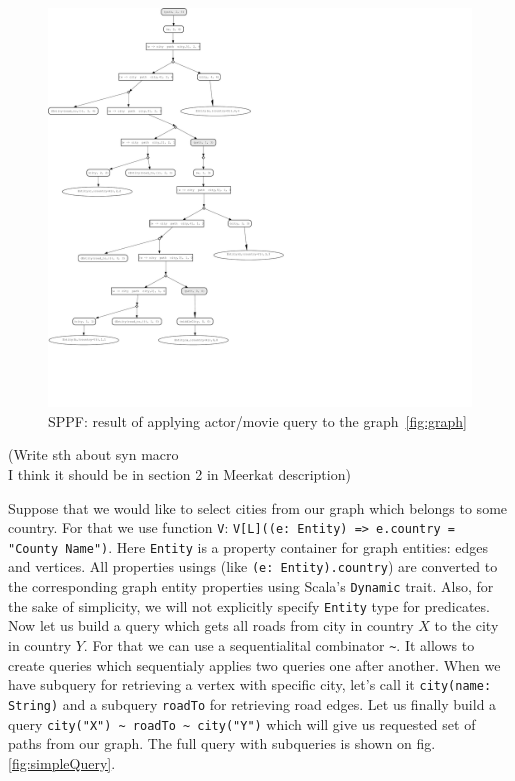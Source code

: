 \begin{figure}[h]
\includegraphics[scale=0.38]{sppf}
\caption{SPPF: result of applying actor/movie query to the graph~\ref{fig:graph}}
\label{fig:sppf}
\end{figure}


(Write sth about syn macro \\ I think it should be in section 2 in Meerkat description)


Suppose that we would like to select cities from our graph which belongs to some country. 
For that we use function \lstinline{V}: \lstinline{V[L]((e: Entity) => e.country = "County Name")}.
Here \lstinline{Entity} is a property container for graph entities: edges and vertices. All properties usings (like \lstinline{(e: Entity).country}) are converted to the corresponding graph entity properties using Scala's \lstinline{Dynamic} trait.
Also, for the sake of simplicity, we will not explicitly specify \lstinline{Entity} type for predicates. 
Now let us build a query which gets all roads from city in country $X$ to the city in country $Y$. 
For that we can use a sequentialital combinator \lstinline{~}. 
It allows to create queries which sequentialy applies two queries one after another. 
When we have subquery for retrieving a vertex with specific city, let's call it \lstinline{city(name: String)} and a subquery \lstinline{roadTo} for retrieving road edges. 
Let us finally build a query \lstinline{city("X") ~ roadTo ~ city("Y")} which will give us requested set of paths from our graph.
The full query with subqueries is shown on fig. \ref{fig:simpleQuery}.


